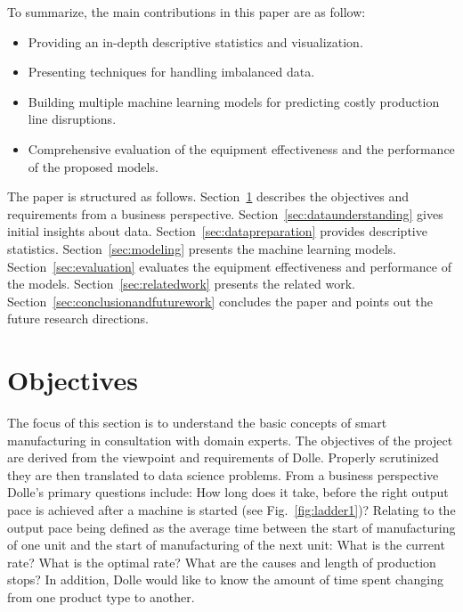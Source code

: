 \documentclass[runningheads]{llncs}
\begin{document}
To summarize, the main contributions in this paper are as follow:
\begin{itemize} 
\item Providing an in-depth descriptive statistics and visualization. 

\item Presenting techniques for handling imbalanced data.

\item Building multiple machine learning models for predicting costly production line disruptions.

\item Comprehensive evaluation of the equipment effectiveness and the performance of the proposed models.
\end{itemize} 

The paper is structured as follows. Section~\ref{sec:businessunderstanding} describes the objectives and requirements from a business perspective. Section~\ref{sec:dataunderstanding} gives initial insights about data. Section~\ref{sec:datapreparation} provides descriptive statistics. Section~\ref{sec:modeling} presents
the machine learning models. Section~\ref{sec:evaluation} evaluates the equipment effectiveness and performance of the models. Section~\ref{sec:relatedwork} presents the related work. Section~\ref{sec:conclusionandfuturework} concludes the paper and points out the future research directions.

\section{Objectives}
\label{sec:businessunderstanding}
The focus of this section is to understand the basic concepts of smart manufacturing in consultation with domain experts. The objectives of the project are derived from the viewpoint and requirements of Dolle. Properly scrutinized they are then translated to data science problems. From a business perspective Dolle's primary questions include: How long does it take, before the right output pace is achieved after a machine is started (see Fig.~\ref{fig:ladder1})? Relating to the output pace being defined as the average time between the start of manufacturing of one unit and the start of manufacturing of the next unit: What is the current rate? What is the optimal rate? What are the causes and length of production stops? In addition, Dolle would like to know the amount of time spent changing from one product type to another.  
\end{document}
